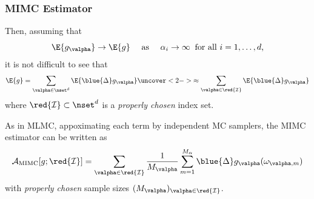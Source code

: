 \begin{frame}\frametitle{MIMC Estimator}
Then, assuming that
\[
  \E{g_\valpha}\rightarrow\E{g} \quad \text{ as } \quad \alpha_i\rightarrow \infty \;\; \text{for all $i=1,\ldots,d$,}
\]
it is not difficult to see that
\[
  \E{g}= \sum_{\valpha\in\nset^d} \E{\blue{\Delta}g_\valpha} \uncover<2->{\approx \sum_{\valpha\in\red{\mathcal I}} \E{\blue{\Delta}g_\valpha}}
\]
where $\red{\mathcal I} \subset \nset^d$  is a \emph{properly chosen} index set.


\medskip
As in MLMC, appoximating each term by independent MC samplers,
the MIMC estimator can be written as
  \begin{align*}
    \mathcal A_{\text{MIMC}}[g ; \red{\mathcal
    I}] = \sum_{\valpha \in \red{\mathcal
    I}}\frac{1}{M_\valpha}
    \sum_{m=1}^{M_\alpha}  \blue{\Delta} g_\valpha(\omega_{\valpha,m})
  \end{align*}
with \emph{properly chosen} sample sizes $(M_\valpha)_{\valpha\in\red{\mathcal I} }$.
\end{frame}




